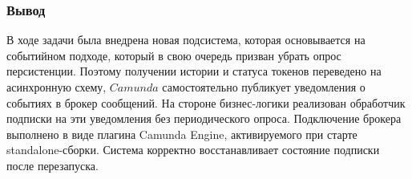 \subsubsection{Вывод}
В ходе задачи была внедрена новая подсистема, которая основывается на событийном подходе, который в свою очередь призван убрать опрос персистенции.
Поэтому получении истории и статуса токенов переведено на асинхронную схему, $Camunda$ самостоятельно публикует уведомления о событиях в брокер сообщений. 
На стороне бизнес-логики реализован обработчик подписки на эти уведомления без периодического опроса. Подключение брокера выполнено в виде плагина Camunda Engine, активируемого при старте standalone-сборки. 
Система корректно восстанавливает состояние подписки после перезапуска.
